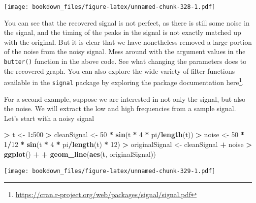 \documentclass[
]{krantz}
\makeatletter
\newenvironment{Shaded}{\begin{snugshade}}{\end{snugshade}}
\newcommand{\DecValTok}[1]{\textcolor[rgb]{0.06,0.06,0.06}{#1}}
\newcommand{\KeywordTok}[1]{\textcolor[rgb]{0.27,0.27,0.27}{\textbf{#1}}}
\newcommand{\NormalTok}[1]{#1}
\newcommand{\OperatorTok}[1]{\textcolor[rgb]{0.43,0.43,0.43}{\textbf{#1}}}
\newcommand{\StringTok}[1]{\textcolor[rgb]{0.5,0.5,0.5}{#1}}
\renewcommand{\href}[2]{#2\footnote{\url{#1}}}
\newenvironment{kframe}{%
\medskip{}
\setlength{\fboxsep}{.8em}
 \def\at@end@of@kframe{}%
 \ifinner\ifhmode%
  \def\at@end@of@kframe{\end{minipage}}%
  \begin{minipage}{\columnwidth}%
 \fi\fi%
 \def\FrameCommand##1{\hskip\@totalleftmargin \hskip-\fboxsep
 \colorbox{shadecolor}{##1}\hskip-\fboxsep
     \hskip-\linewidth \hskip-\@totalleftmargin \hskip\columnwidth}%
 \MakeFramed {\advance\hsize-\width
   \@totalleftmargin\z@ \linewidth\hsize
   \@setminipage}}%
 {\par\unskip\endMakeFramed%
 \at@end@of@kframe}
\renewenvironment{Shaded}{\begin{kframe}}{\end{kframe}}
\makeatother
\begin{document}
\texttt{[image: bookdown\_files/figure-latex/unnamed-chunk-328-1.pdf]}

You can see that the recovered signal is not perfect, as there is still some noise in the signal, and the timing of the peaks in the signal is not exactly matched up with the original. But it is clear that we have nonetheless removed a large portion of the noise from the noisy signal. Mess around with the argument values in the \texttt{butter()} function in the above code. See what changing the parameters does to the recovered graph. You can also explore the wide variety of filter functions available in the \texttt{signal} package by exploring the package documentation \href{https://cran.r-project.org/web/packages/signal/signal.pdf}{here}.

For a second example, suppose we are interested in not only the signal, but also the noise. We will extract the low and high frequencies from a sample signal. Let's start with a noisy signal

\begin{Shaded}
\begin{Highlighting}[]
\OperatorTok{\textgreater{}}\StringTok{ }\NormalTok{t \textless{}{-}}\StringTok{ }\DecValTok{1}\OperatorTok{:}\DecValTok{500}
\OperatorTok{\textgreater{}}\StringTok{ }\NormalTok{cleanSignal \textless{}{-}}\StringTok{ }\DecValTok{50} \OperatorTok{*}\StringTok{ }\KeywordTok{sin}\NormalTok{(t }\OperatorTok{*}\StringTok{ }\DecValTok{4} \OperatorTok{*}\StringTok{ }\NormalTok{pi}\OperatorTok{/}\KeywordTok{length}\NormalTok{(t))}
\OperatorTok{\textgreater{}}\StringTok{ }\NormalTok{noise \textless{}{-}}\StringTok{ }\DecValTok{50} \OperatorTok{*}\StringTok{ }\DecValTok{1}\OperatorTok{/}\DecValTok{12} \OperatorTok{*}\StringTok{ }\KeywordTok{sin}\NormalTok{(t }\OperatorTok{*}\StringTok{ }\DecValTok{4} \OperatorTok{*}\StringTok{ }\NormalTok{pi}\OperatorTok{/}\KeywordTok{length}\NormalTok{(t) }\OperatorTok{*}\StringTok{ }\DecValTok{12}\NormalTok{)}
\OperatorTok{\textgreater{}}\StringTok{ }\NormalTok{originalSignal \textless{}{-}}\StringTok{ }\NormalTok{cleanSignal }\OperatorTok{+}\StringTok{ }\NormalTok{noise}
\OperatorTok{\textgreater{}}\StringTok{ }\KeywordTok{ggplot}\NormalTok{() }\OperatorTok{+}\StringTok{ }
\OperatorTok{+}\StringTok{   }\KeywordTok{geom\_line}\NormalTok{(}\KeywordTok{aes}\NormalTok{(t, originalSignal))}
\end{Highlighting}
\end{Shaded}

\texttt{[image: bookdown\_files/figure-latex/unnamed-chunk-329-1.pdf]}
\end{document}

